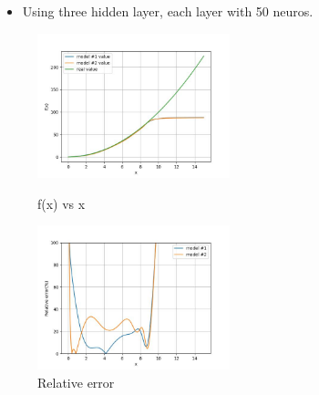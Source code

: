 \documentclass{beamer}
\begin{document}
\begin{frame}
    \frametitle{\secname}
    \begin{itemize}
        \item Using three hidden layer, each layer with 50 neuros.
    \end{itemize}

    \begin{figure}
        \begin{multicols}{2}
            \includegraphics[width=2.2in]{Figs/Value_50_3.jpg}
            \caption{f(x) vs x}
            \columnbreak

            \includegraphics[width=2.2in]{Figs/Error_50_3.jpg}
            \caption{Relative error}
        \end{multicols}
    \end{figure}
\end{frame}
\end{document}
